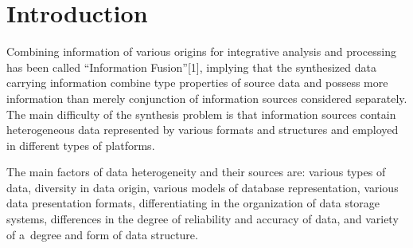       
      
      
      
      
       \thispagestyle{myheadings}
      
       \begin{multicols}{2}
      
       \label{st\stat}
     
     \section{Introduction}
      
     \noindent
     Combining information of various origins for integrative analysis and 
processing has been called ``Information Fusion''[1], implying that the synthesized 
data carrying information combine type properties of source data and possess 
more information than merely conjunction of information sources considered 
separately. The main difficulty of the synthesis problem is that information sources 
contain heterogeneous data represented by various formats and structures and 
employed in different types of platforms.
     
     The main factors of data heterogeneity and their sources are: various types 
of data, diversity in data origin, various models of database representation, various 
data presentation formats, differentiating in the organization of data storage 
systems, differences in the degree of reliability and accuracy of data, and
variety of  a~degree and form of data structure.
     

\end{multicols}
